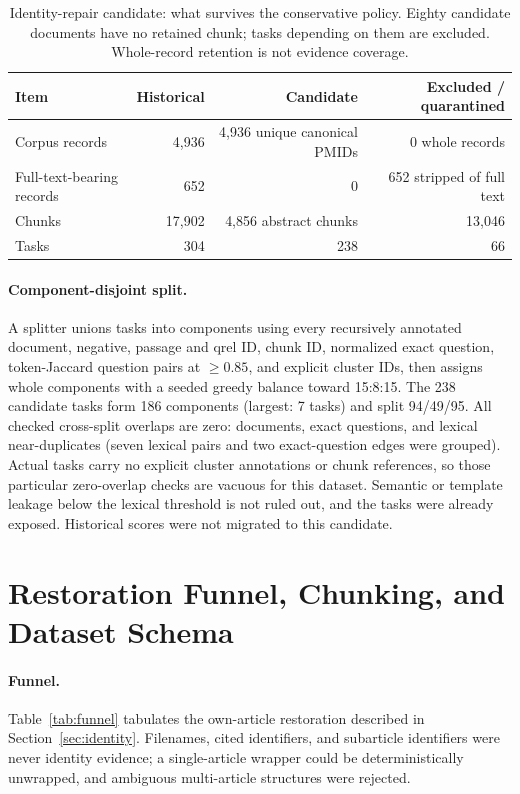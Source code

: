 \begin{table}[h]
\centering
\small
\caption{Identity-repair candidate: what survives the conservative policy. Eighty candidate documents have no retained chunk; tasks depending on them are excluded. Whole-record retention is not evidence coverage.}
\label{tab:repair}
\begin{tabular}{@{}lrrr@{}}
\toprule
Item & Historical & Candidate & Excluded / quarantined \\
\midrule
Corpus records & 4,936 & 4,936 unique canonical PMIDs & 0 whole records \\
Full-text-bearing records & 652 & 0 & 652 stripped of full text \\
Chunks & 17,902 & 4,856 abstract chunks & 13,046 \\
Tasks & 304 & 238 & 66 \\
\bottomrule
\end{tabular}
\end{table}

\paragraph{Component-disjoint split.}
A splitter unions tasks into components using every recursively annotated document, negative, passage and qrel ID, chunk ID, normalized exact question, token-Jaccard question pairs at $\geq0.85$, and explicit cluster IDs, then assigns whole components with a seeded greedy balance toward 15:8:15. The 238 candidate tasks form 186 components (largest: 7 tasks) and split 94/49/95. All checked cross-split overlaps are zero: documents, exact questions, and lexical near-duplicates (seven lexical pairs and two exact-question edges were grouped). Actual tasks carry no explicit cluster annotations or chunk references, so those particular zero-overlap checks are vacuous for this dataset. Semantic or template leakage below the lexical threshold is not ruled out, and the tasks were already exposed. Historical scores were not migrated to this candidate.

\section{Restoration Funnel, Chunking, and Dataset Schema}
\label{app:restoration}
\paragraph{Funnel.}
Table~\ref{tab:funnel} tabulates the own-article restoration described in Section~\ref{sec:identity}. Filenames, cited identifiers, and subarticle identifiers were never identity evidence; a single-article wrapper could be deterministically unwrapped, and ambiguous multi-article structures were rejected.

